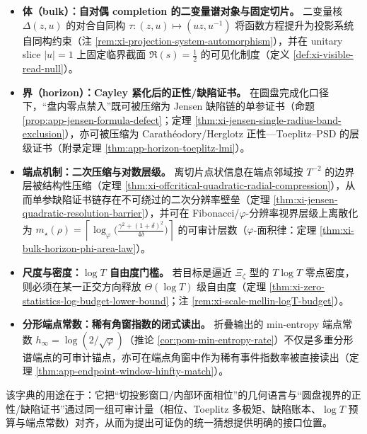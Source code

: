 \begin{itemize}
  \item \textbf{体（bulk）：自对偶 completion 的二变量谱对象与固定切片。}
  二变量核 \(\Delta(z,u)\) 的对合自同构 \(\tau:(z,u)\mapsto(uz,u^{-1})\) 将函数方程提升为投影系统自同构约束（注 \ref{rem:xi-projection-system-automorphism}），并在 unitary slice \(|u|=1\) 上固定临界截面 \(\Re(s)=\tfrac12\) 的可见化制度（定义 \ref{def:xi-visible-read-null}）。
  \item \textbf{界（horizon）：Cayley 紧化后的正性/缺陷证书。}
  在圆盘完成化口径下，“盘内零点禁入”既可被压缩为 Jensen 缺陷链的单参证书（命题 \ref{prop:app-jensen-formula-defect}；定理 \ref{thm:xi-jensen-single-radius-band-exclusion}），亦可被压缩为 Carath\'eodory/Herglotz 正性—Toeplitz--PSD 的层级证书（附录定理 \ref{thm:app-horizon-toeplitz-lmi}）。
  \item \textbf{端点机制：二次压缩与对数层级。}
  离切片点状信息在端点邻域按 \(T^{-2}\) 的边界层被结构性压缩（定理 \ref{thm:xi-offcritical-quadratic-radial-compression}），从而单参缺陷证书链存在不可绕过的二次分辨率壁垒（定理 \ref{thm:xi-jensen-quadratic-resolution-barrier}），并可在 Fibonacci/\(\varphi\)-分辨率视界层级上离散化为
  \(m_\star(\rho)=\left\lceil \log_{\varphi}\!\bigl(\frac{\gamma^2+(1+\delta)^2}{4\delta}\bigr)\right\rceil\)
  的可审计层数（\(\varphi\)-面积律：定理 \ref{thm:xi-bulk-horizon-phi-area-law}）。
  \item \textbf{尺度与密度：\texorpdfstring{$\log T$}{log T} 自由度门槛。}
  若目标是逼近 \(\Xi_\zeta\) 型的 \(T\log T\) 零点密度，则必须在某一正交方向释放 \(\Theta(\log T)\) 级自由度（定理 \ref{thm:xi-zero-statistics-log-budget-lower-bound}；注 \ref{rem:xi-scale-mellin-logT-budget}）。
  \item \textbf{分形端点常数：稀有角窗指数的闭式读出。}
  折叠输出的 min-entropy 端点常数 \(h_\infty=\log(2/\sqrt\varphi)\)（推论 \ref{cor:pom-min-entropy-rate}）不仅是多重分形谱端点的可审计锚点，亦可在端点角窗中作为稀有事件指数率被直接读出（定理 \ref{thm:app-endpoint-window-hinfty-match}）。
\end{itemize}
该字典的用途在于：它把“切投影窗口/内部环面相位”的几何语言与“圆盘视界的正性/缺陷证书”通过同一组可审计量（相位、Toeplitz 多极矩、缺陷账本、\(\log T\) 预算与端点常数）对齐，从而为提出可证伪的统一猜想提供明确的接口位置。

